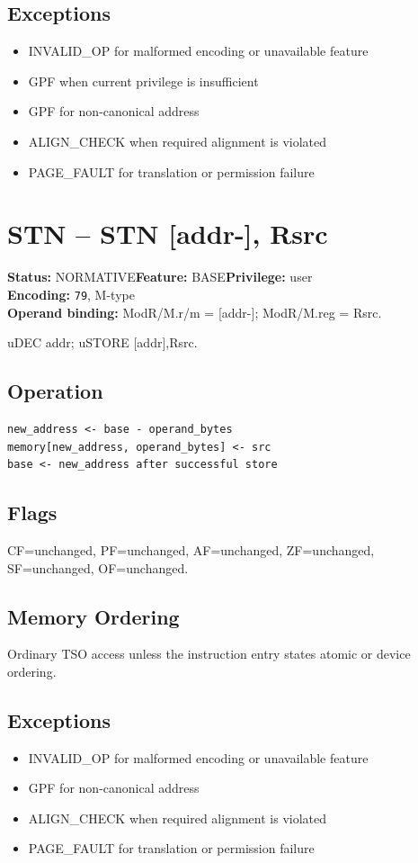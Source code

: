 \documentclass[10pt]{article}
\begin{document}
\subsection*{Exceptions}
\begin{itemize}
\item INVALID\_OP for malformed encoding or unavailable feature
\item GPF when current privilege is insufficient
\item GPF for non-canonical address
\item ALIGN\_CHECK when required alignment is violated
\item PAGE\_FAULT for translation or permission failure
\end{itemize}
\clearpage

\section{STN -- STN [addr-], Rsrc}
\textbf{Status:} NORMATIVE\quad \textbf{Feature:} BASE\quad \textbf{Privilege:} user\\
\textbf{Encoding:} \texttt{79}, M-type\\
\textbf{Operand binding:} ModR/M.r/m = [addr-]; ModR/M.reg = Rsrc.

uDEC addr; uSTORE [addr],Rsrc.

\subsection*{Operation}
\begin{lstlisting}
new_address <- base - operand_bytes
memory[new_address, operand_bytes] <- src
base <- new_address after successful store
\end{lstlisting}
\subsection*{Flags}
CF=unchanged, PF=unchanged, AF=unchanged, ZF=unchanged, SF=unchanged, OF=unchanged.
\subsection*{Memory Ordering}
Ordinary TSO access unless the instruction entry states atomic or device ordering.
\subsection*{Exceptions}
\begin{itemize}
\item INVALID\_OP for malformed encoding or unavailable feature
\item GPF for non-canonical address
\item ALIGN\_CHECK when required alignment is violated
\item PAGE\_FAULT for translation or permission failure
\end{itemize}
\clearpage
\end{document}
